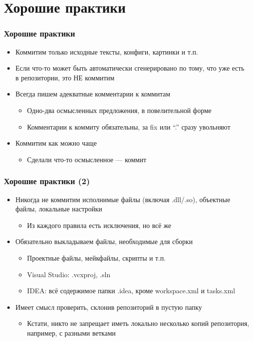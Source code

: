 \documentclass{../slides-style}
\begin{document}
    \section{Хорошие практики}

    \begin{frame}
        \frametitle{Хорошие практики}
        \begin{itemize}
            \item Коммитим только исходные тексты, конфиги, картинки и т.п.
            \item Если что-то может быть автоматически сгенерировано по тому, что уже есть в репозитории, это НЕ коммитим
            \item Всегда пишем адекватные комментарии к коммитам
            \begin{itemize}
                \item Одно-два осмысленных предложения, в повелительной форме
                \item Комментарии к коммиту обязательны, за fix или ``.'' сразу увольняют
            \end{itemize}
            \item Коммитим как можно чаще
            \begin{itemize}
                \item Сделали что-то осмысленное --- коммит
            \end{itemize}
        \end{itemize}
    \end{frame}

    \begin{frame}
        \frametitle{Хорошие практики (2)}
        \begin{itemize}
            \item Никогда не коммитим исполнимые файлы (включая .dll/.so), объектные файлы, локальные настройки
            \begin{itemize}
                \item Из каждого правила есть исключения, но всё же
            \end{itemize}
            \item Обязательно выкладываем файлы, необходимые для сборки
            \begin{itemize}
                \item Проектные файлы, мейкфайлы, скрипты и т.п.
                \item Visual Studio: .vcxproj, .sln
                \item IDEA: всё содержимое папки .idea, кроме workspace.xml и tasks.xml
            \end{itemize}
            \item Имеет смысл проверить, склонив репозиторий в пустую папку
            \begin{itemize}
                \item Кстати, никто не запрещает иметь локально несколько копий репозитория, например, с разными ветками
            \end{itemize}
        \end{itemize}
    \end{frame}
\end{document}
